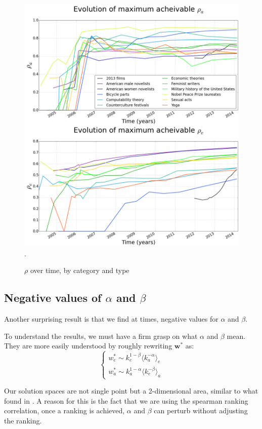 \begin{figure}[!t]
\centering
\includegraphics[width=0.9\columnwidth]{Figures/rho_combined.png}.
\caption{$\rho$ over time, by category and type}
\label{fig:rhotime}
\end{figure}


\subsection{Negative values of $\alpha$ and $\beta$}
Another surprising result is that we find at times, negative values for $\alpha$ and $\beta$.

To understand the results, we must have a firm grasp on what $\alpha$ and $\beta$ mean. They are more easily understood by roughly rewriting $\mathbf{w^*}$ as:
\begin{equation}
\begin{cases}
w^{*}_{e} \sim k^{1-\beta}_{e} \langle k_{a}^{-\alpha}\rangle_e \\
w^{*}_{a} \sim k^{1-\alpha}_{a} \langle k_{e}^{-\beta}\rangle_a
\end{cases} \label{eqsim}
\end{equation}

Our solution spaces are not single point but a 2-dimensional area, similar to what found in \cite{caldarelli2012network}. A reason for this is the fact that we are using the spearman ranking correlation, once a ranking is achieved, $\alpha$ and $\beta$ can perturb without adjusting the ranking. 

